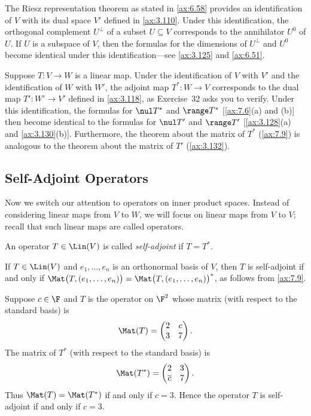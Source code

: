The Riesz representation theorem as stated in \ref{ax:6.58} provides an
identification of $V$ with its dual space $V'$ defined in \ref{ax:3.110}. Under
this identification, the orthogonal complement $U^\perp$ of a subset
$U\subseteq V$ corresponds to the annihilator $U^0$ of $U$. If $U$ is a subspace
of $V$, then the formulas for the dimensions of $U^\perp$ and $U^0$ become
identical under this identification---see \ref{ax:3.125} and \ref{ax:6.51}.

%
Suppose $T\colon V\to W$ is a linear map. Under the identification of $V$ with
$V'$ and the identification of $W$ with $W'$, the adjoint map
$T^*\colon W\to V$ corresponds to the dual map $T'\colon W'\to V'$ defined in
\ref{ax:3.118}, as Exercise~32 asks you to verify. Under this identification,
the formulas for $\nul T^*$ and $\range T^*$ [\ref{ax:7.6}(a) and (b)] then
become identical to the formulas for $\nul T'$ and $\range T'$
[\ref{ax:3.128}(a) and \ref{ax:3.130}(b)]. Furthermore, the theorem about the
matrix of $T^*$ (\ref{ax:7.9}) is analogous to the theorem about the matrix of
$T'$ (\ref{ax:3.132}).

\subsection{Self-Adjoint Operators}

Now we switch our attention to operators on inner product spaces. Instead of
considering linear maps from $V$ to $W$, we will focus on linear maps from $V$
to $V$; recall that such linear maps are called operators.

\begin{definition}\label{ax:7.10}
An operator $T\in\Lin(V)$ is called \emph{self-adjoint} if $T=T^*$.
\end{definition}

If $T\in\Lin(V)$ and $e_1,\dots,e_n$ is an orthonormal basis of $V$, then $T$
is self-adjoint if and only if
$\Mat\bigl(T,(e_1,\dots,e_n)\bigr)=\Mat\bigl(T,(e_1,\dots,e_n)\bigr)^*$, as
follows from \ref{ax:7.9}.

\begin{example}%
\label{ax:7.11}
Suppose $c\in\F$ and $T$ is the operator on $\F^2$ whose matrix (with respect
to the standard basis) is
\[ \Mat(T) = \begin{pmatrix} 2 & c\\ 3 & 7 \end{pmatrix}. \]
The matrix of $T^*$ (with respect to the standard basis) is
\[ \Mat(T^*) = \begin{pmatrix} 2 & 3\\ \overline{c} & 7 \end{pmatrix}. \]
Thus $\Mat(T)=\Mat(T^*)$ if and only if $c=3$. Hence the operator $T$ is
self-adjoint if and only if $c=3$.
\end{example}

